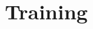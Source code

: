 \documentclass[article, 10pt]{IEEEtran}
\begin{document}









\section{Training}\label{sec:5_training}

\end{document}
